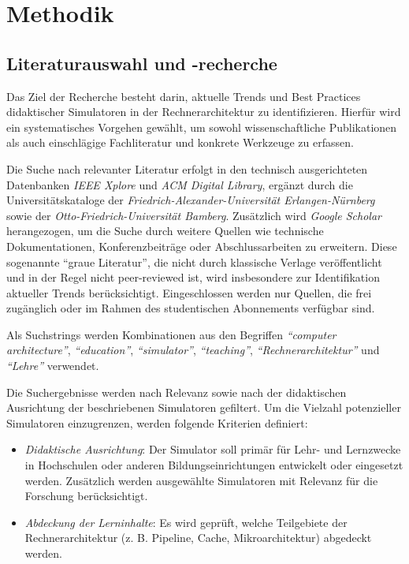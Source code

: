 \chapter{Methodik}

\section{Literaturauswahl und -recherche}

Das Ziel der Recherche besteht darin, aktuelle Trends und Best Practices didaktischer Simulatoren in der Rechnerarchitektur zu identifizieren. Hierfür wird ein systematisches Vorgehen gewählt, um sowohl wissenschaftliche Publikationen als auch einschlägige Fachliteratur und konkrete Werkzeuge zu erfassen.

Die Suche nach relevanter Literatur erfolgt in den technisch ausgerichteten Datenbanken \textit{IEEE Xplore} und \textit{ACM Digital Library}, ergänzt durch die Universitätskataloge der \textit{Friedrich-Alexander-Universität Erlangen-Nürnberg} sowie der \textit{Otto-Friedrich-Universität Bamberg}. Zusätzlich wird \textit{Google Scholar} herangezogen, um die Suche durch weitere Quellen wie technische Dokumentationen, Konferenzbeiträge oder Abschlussarbeiten zu erweitern. Diese sogenannte \enquote{graue Literatur}, die nicht durch klassische Verlage veröffentlicht und in der Regel nicht peer-reviewed ist, wird insbesondere zur Identifikation aktueller Trends berücksichtigt. Eingeschlossen werden nur Quellen, die frei zugänglich oder im Rahmen des studentischen Abonnements verfügbar sind.

Als Suchstrings werden Kombinationen aus den Begriffen \textit{\enquote{computer architecture}}, \textit{\enquote{education}}, \textit{\enquote{simulator}}, \textit{\enquote{teaching}}, \textit{\enquote{Rechnerarchitektur}} und \textit{\enquote{Lehre}} verwendet.

Die Suchergebnisse werden nach Relevanz sowie nach der didaktischen Ausrichtung der beschriebenen Simulatoren gefiltert. Um die Vielzahl potenzieller Simulatoren einzugrenzen, werden folgende Kriterien definiert:

\begin{itemize}
  \item \textit{Didaktische Ausrichtung}: Der Simulator soll primär für Lehr- und Lernzwecke in Hochschulen oder anderen Bildungseinrichtungen entwickelt oder eingesetzt werden. Zusätzlich werden ausgewählte Simulatoren mit Relevanz für die Forschung berücksichtigt.
  \item \textit{Abdeckung der Lerninhalte}: Es wird geprüft, welche Teilgebiete der Rechnerarchitektur (z. B. Pipeline, Cache, Mikroarchitektur) abgedeckt werden.
\end{itemize}

